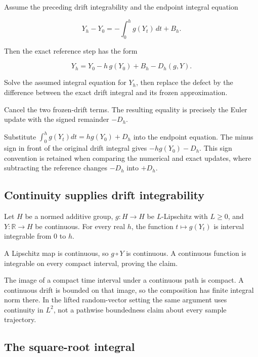 \documentclass[11pt,a4paper]{article}
\begin{document}
Assume the preceding drift integrability and the endpoint integral equation

\[Y_h-Y_0=-\int_0^h g(Y_t)\,dt+B_h.\]

Then the exact reference step has the form

\[Y_h=Y_0-h\,g(Y_0)+B_h-D_h(g,Y).\]

Solve the assumed integral equation for \(Y_h\), then replace the defect by the difference between the exact drift integral and its frozen approximation.



Cancel the two frozen-drift terms. The resulting equality is precisely the Euler update with the signed remainder \(-D_h\).



Substitute \(\int_0^hg(Y_t)dt=hg(Y_0)+D_h\) into the endpoint equation. The minus sign in front of the original drift integral gives \(-hg(Y_0)-D_h\). This sign convention is retained when comparing the numerical and exact updates, where subtracting the reference changes \(-D_h\) into \(+D_h\).


\subsection{\texorpdfstring{Continuity supplies drift integrability}{Continuity supplies drift integrability}}


Let \(H\) be a normed additive group, \(g:H\to H\) be \(L\)-Lipschitz with \(L\ge0\), and \(Y:\mathbb R\to H\) be continuous. For every real \(h\), the function \(t\mapsto g(Y_t)\) is interval integrable from \(0\) to \(h\).



A Lipschitz map is continuous, so \(g\circ Y\) is continuous. A continuous function is integrable on every compact interval, proving the claim.



The image of a compact time interval under a continuous path is compact. A continuous drift is bounded on that image, so the composition has finite integral norm there. In the lifted random-vector setting the same argument uses continuity in \(L^2\), not a pathwise boundedness claim about every sample trajectory.


\subsection{\texorpdfstring{The square-root integral}{The square-root integral}}
\end{document}
